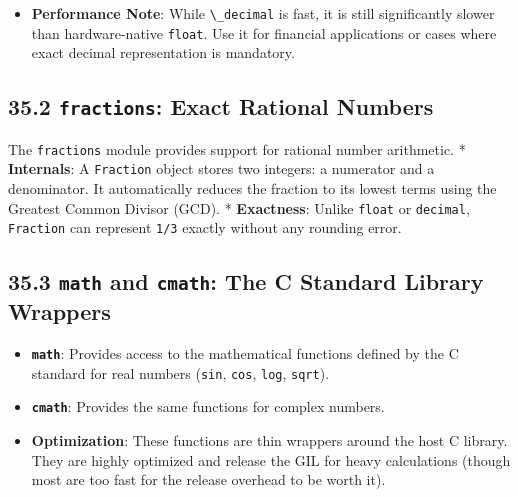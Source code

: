 \begin{itemize}
\tightlist
\item
  \textbf{Performance Note}: While \passthrough{\lstinline!\_decimal!}
  is fast, it is still significantly slower than hardware-native
  \passthrough{\lstinline!float!}. Use it for financial applications or
  cases where exact decimal representation is mandatory.
\end{itemize}

\hypertarget{fractions-exact-rational-numbers}{%
\subsection{\texorpdfstring{35.2 \texttt{fractions}: Exact Rational
Numbers}{35.2 fractions: Exact Rational Numbers}}\label{fractions-exact-rational-numbers}}

The \passthrough{\lstinline!fractions!} module provides support for
rational number arithmetic. * \textbf{Internals}: A
\passthrough{\lstinline!Fraction!} object stores two integers: a
numerator and a denominator. It automatically reduces the fraction to
its lowest terms using the Greatest Common Divisor (GCD). *
\textbf{Exactness}: Unlike \passthrough{\lstinline!float!} or
\passthrough{\lstinline!decimal!}, \passthrough{\lstinline!Fraction!}
can represent \passthrough{\lstinline!1/3!} exactly without any rounding
error.

\hypertarget{math-and-cmath-the-c-standard-library-wrappers}{%
\subsection{\texorpdfstring{35.3 \texttt{math} and \texttt{cmath}: The C
Standard Library
Wrappers}{35.3 math and cmath: The C Standard Library Wrappers}}\label{math-and-cmath-the-c-standard-library-wrappers}}

\begin{itemize}
\tightlist
\item
  \textbf{\passthrough{\lstinline!math!}}: Provides access to the
  mathematical functions defined by the C standard for real numbers
  (\passthrough{\lstinline!sin!}, \passthrough{\lstinline!cos!},
  \passthrough{\lstinline!log!}, \passthrough{\lstinline!sqrt!}).
\item
  \textbf{\passthrough{\lstinline!cmath!}}: Provides the same functions
  for complex numbers.
\item
  \textbf{Optimization}: These functions are thin wrappers around the
  host C library. They are highly optimized and release the GIL for
  heavy calculations (though most are too fast for the release overhead
  to be worth it).
\end{itemize}

